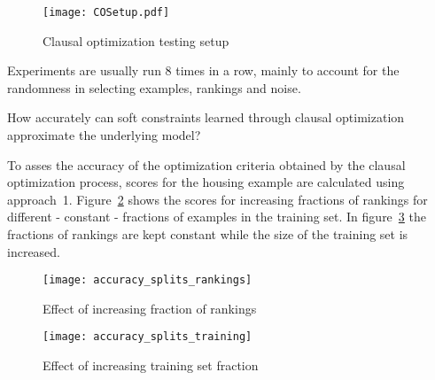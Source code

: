 \begin{figure}

	\caption{Clausal optimization testing setup}
	\centering
		\texttt{[image: COSetup.pdf]}
	\label{fig:co_test_setup}

\end{figure}

Experiments are usually run $8$ times in a row, mainly to account for the randomness in selecting examples, rankings and noise.

\begin{question}
	How accurately can soft constraints learned through clausal optimization approximate the underlying model?
\end{question}

\begin{experiment}

	To asses the accuracy of the optimization criteria obtained by the clausal optimization process, scores for the housing example are calculated using approach~1.
	Figure~\ref{fig:accuracy_splits_rankings} shows the scores for increasing fractions of rankings for different - constant - fractions of examples in the training set.
	In figure~\ref{fig:accuracy_splits_training} the fractions of rankings are kept constant while the size of the training set is increased.

	\begin{figure}

		\caption{Effect of increasing fraction of rankings}
		\centering
			\texttt{[image: accuracy\_splits\_rankings]}
		\label{fig:accuracy_splits_rankings}

	\end{figure}

	\begin{figure}

		\caption{Effect of increasing training set fraction}
		\centering
			\texttt{[image: accuracy\_splits\_training]}
		\label{fig:accuracy_splits_training}

	\end{figure}

\end{experiment}


